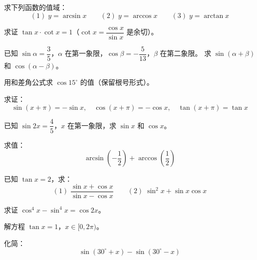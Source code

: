 \begin{exercise}[2]
求下列函数的值域：
\[
(1)\; y = \arcsin x \qquad (2)\; y = \arccos x \qquad (3)\; y = \arctan x
\]
\end{exercise}

\begin{exercise}[2]
求证 \(\tan x \cdot \cot x = 1\)（\(\cot x = \dfrac{\cos x}{\sin x}\) 是余切）。
\end{exercise}


\begin{exercise}[3]
已知 \(\sin \alpha = \dfrac{3}{5}\)，\(\alpha\) 在第一象限，\(\cos \beta = -\dfrac{5}{13}\)，\(\beta\) 在第二象限。
求 \(\sin(\alpha + \beta)\) 和 \(\cos(\alpha - \beta)\)。
\end{exercise}

\begin{exercise}[3]
用和差角公式求 \(\cos 15^\circ\) 的值（保留根号形式）。
\end{exercise}

\begin{exercise}[3]
求证：
\[
\sin(x + \pi) = -\sin x,\quad \cos(x + \pi) = -\cos x,\quad \tan(x + \pi) = \tan x
\]
\end{exercise}

\begin{exercise}[3]
已知 \(\sin 2x = \dfrac{4}{5}\)，\(x\) 在第一象限，求 \(\sin x\) 和 \(\cos x\)。
\end{exercise}

\begin{exercise}[3]
求值：
\[
\arcsin\left(-\frac{1}{2}\right) + \arccos\left(\frac{1}{2}\right)
\]
\end{exercise}


\begin{exercise}[4]
已知 \(\tan x = 2\)，求：
\[
(1)\; \frac{\sin x + \cos x}{\sin x - \cos x} \qquad
(2)\; \sin^2 x + \sin x \cos x
\]
\end{exercise}

\begin{exercise}[4]
求证 \(\cos^4 x - \sin^4 x = \cos 2x\)。
\end{exercise}

\begin{exercise}[4]
解方程 \(\tan x = 1\)，\(x \in [0, 2\pi)\)。
\end{exercise}

\begin{exercise}[4]
化简：
\[
\sin(30^\circ + x) - \sin(30^\circ - x)
\]
\end{exercise}

